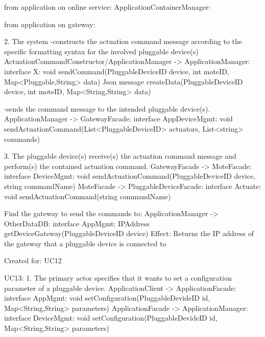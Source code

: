                 from application on online service:
                    ApplicationContainerManager:

                from application on gateway:

            2. The system
                -constructs the actuation command message according to the specific formatting syntax for the involved pluggable device(s)
                    ActuationCommandConstructor/ApplicationManager -> ApplicationManager: interface X:
                                                void sendCommand(PluggableDeviceID device, int moteID, Map<Pluggable,String> data)
                                                   Json message createData(PluggableDeviceID device, int moteID, Map<String,String> data)

                -sends the command message to the intended pluggable device(s).
                    ApplicationManager -> GatewayFacade: interface AppDeviceMgmt:
                                                            void sendActuationCommand(List<PluggableDeviceID> actuators, List<string> commands)


            3. The pluggable device(s) receive(s) the actuation command message and perform(s) the contained actuation command.
                    GatewayFacade -> MoteFacade:         interface DeviceMgmt: void sendActuationCommand(PluggableDeviceID device, string commandName)
                    MoteFacade -> PluggableDeviceFacade: interface Actuate:    void sendActuationCommand(string commandName)


            Find the gateway to send the commands  to:
                ApplicationManager -> OtherDataDB: interface AppMgmt: IPAddress getDeviceGateway(PluggableDeviceID device)
                    Effect: Returns the IP address of the gateway that a pluggable device is connected to
                    \item Created for: UC12


        UC13:
            1. The primary actor specifies that it wants to set a configuration parameter of a pluggable
            device.
                ApplicationClient -> ApplicationFacade: interface AppMgmt:
                                                        void setConfiguration(PluggableDevideID id, Map<String,String> parameters)
                ApplicationFacade -> ApplicationManager: interface DeviceMgmt:
                                                        void setConfiguration(PluggableDevideID id, Map<String,String> parameters)


